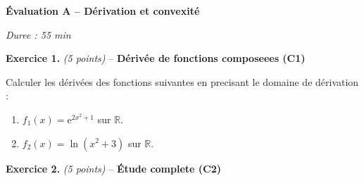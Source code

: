 %
%
%
%

\textbf{Évaluation A -- Dérivation et convexité}

\begin{center}
\textit{Duree : 55 min}
\end{center}

\textbf{Exercice 1.} \textit{(5 points)} -- \textbf{Dérivée de fonctions composeees (C1)}

Calculer les dérivées des fonctions suivantes en precisant le domaine de dérivation :
\begin{enumerate}
  \item $f_1(x) = \mathrm{e}^{2x^2 + 1}$ sur $\mathbb{R}$.
  \item $f_2(x) = \ln(x^2 + 3)$ sur $\mathbb{R}$.
\end{enumerate}

\bigskip

\textbf{Exercice 2.} \textit{(5 points)} -- \textbf{Étude complete (C2)}

